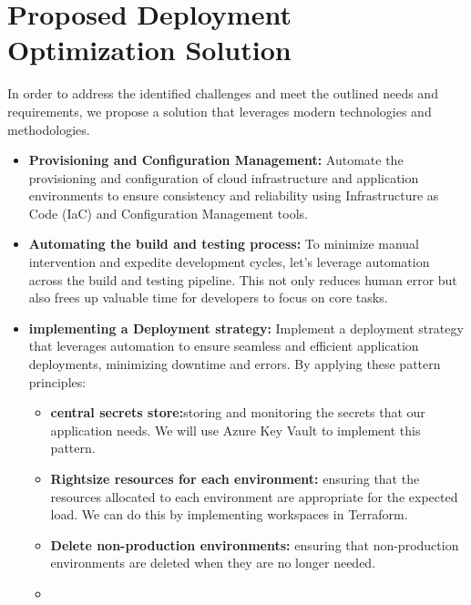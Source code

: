 \section{Proposed Deployment Optimization Solution}
In order to address the identified challenges and meet the outlined needs and requirements, we propose a solution that leverages modern technologies and methodologies.
\begin{itemize}

    \item \textbf{Provisioning and Configuration Management:}
          Automate the provisioning and configuration of cloud infrastructure and application environments to ensure consistency and reliability using Infrastructure as Code (IaC) and Configuration Management tools.

    \item \textbf{Automating the build and testing process:}
          To minimize manual intervention and expedite development cycles, let's leverage automation across the build and testing pipeline. This not only reduces human error but also frees up valuable time for developers to focus on core tasks.
    \item \textbf{implementing a Deployment strategy:}
          Implement a deployment strategy that leverages automation to ensure seamless and efficient application deployments, minimizing downtime and errors. By applying these pattern principles:
          \begin{itemize}
              \item \textbf{central secrets store:}storing and monitoring the secrets that our application needs. We will use Azure Key Vault to implement this pattern.
              \item \textbf{Rightsize resources for each environment:} ensuring that the resources allocated to each environment are appropriate for the expected load. We can do this by implementing workspaces in Terraform.
              \item \textbf{Delete non-production environments:} ensuring that non-production environments are deleted when they are no longer needed.
              \item \end{itemize}
\end{itemize}



